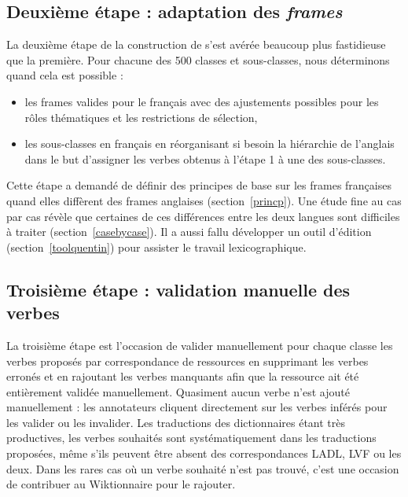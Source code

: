 
\subsection{Deuxième étape : adaptation des \textit{frames}}\label{second}

La deuxième étape de la construction de \verbenet{} s'est avérée beaucoup plus
fastidieuse que la première. Pour chacune des 500 classes et sous-classes, nous
déterminons quand cela est possible :

\begin{itemize}

    \item les frames valides pour le français avec des ajustements possibles
        pour les rôles thématiques et les restrictions de sélection,

    \item les sous-classes en français en réorganisant si besoin la hiérarchie
        de l'anglais dans le but d'assigner les verbes obtenus à l'étape 1 à
        une des sous-classes.

\end{itemize}

Cette étape a demandé de définir des principes de base sur les frames
françaises quand elles diffèrent des frames anglaises (section~\ref{princp}).
Une étude fine au cas par cas révèle que certaines de ces différences entre les
deux langues sont difficiles à traiter (section~\ref{casebycase}). Il a aussi
fallu développer un outil d'édition (section~\ref{toolquentin}) pour assister
le travail lexicographique. 

\subsection{Troisième étape : validation manuelle des verbes}
\label{third}

La troisième étape est l'occasion de valider manuellement pour chaque classe
les verbes proposés par correspondance de ressources en supprimant les verbes
erronés et en rajoutant les verbes manquants afin que la ressource ait été
entièrement validée manuellement. Quasiment aucun verbe n'est ajouté
manuellement : les annotateurs cliquent directement sur les verbes inférés pour
les valider ou les invalider.  Les traductions des dictionnaires étant très
productives, les verbes souhaités sont systématiquement dans les traductions
proposées, même s'ils peuvent être absent des correspondances LADL, LVF ou les
deux. Dans les rares cas où un verbe souhaité n'est pas trouvé, c'est une
occasion de contribuer au Wiktionnaire pour le rajouter.

